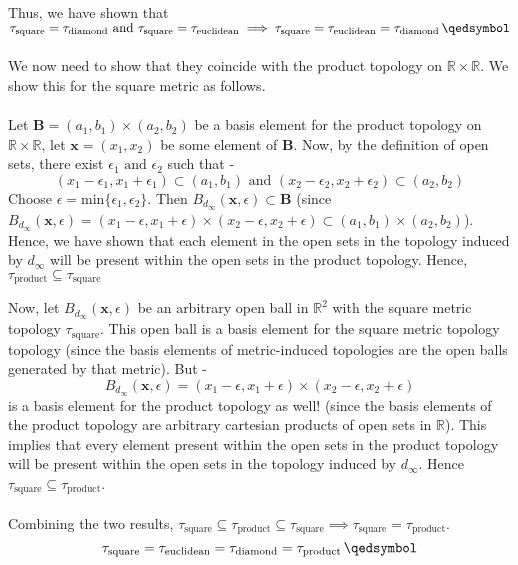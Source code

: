 \begin{frame}
    Thus, we have shown that $\tau_{\text{square}} = \tau_{\text{diamond}} \text{ and } \tau_{\text{square}} = \tau_{\text{euclidean}} \implies \tau_{\text{square}} = \tau_{\text{euclidean}} = \tau_{\text{diamond}} \, \qedsymbol$ \\\\
    We now need to show that they coincide with the product topology on $\mathbb{R} \times \mathbb{R}$. We show this for the square metric as follows. \\\\
    Let $\boldsymbol{B} = (a_1,b_1) \times (a_2,b_2)$ be a basis element for the product topology on $\mathbb{R} \times \mathbb{R}$, let $\boldsymbol{x} = (x_1, x_2)$ be some element of $\boldsymbol{B}$. Now, by the definition of open sets, there exist $\epsilon_1 \text{ and } \epsilon_2$ such that -
    \begin{equation*}
        (x_1 - \epsilon_1,x_1 + \epsilon_1) \subset (a_1,b_1) \text{ and }(x_2 - \epsilon_2,x_2 + \epsilon_2) \subset (a_2,b_2)
    \end{equation*}
    Choose $\epsilon = \text{min} \{\epsilon_1, \epsilon_2\}$. Then $B_{d_\infty}(\boldsymbol{x},\epsilon) \subset \boldsymbol{B}$ (since $B_{d_\infty}(\boldsymbol{x},\epsilon) = (x_1 - \epsilon,x_1 + \epsilon) \times (x_2 - \epsilon,x_2 + \epsilon)\subset (a_1,b_1) \times (a_2,b_2)$).\\
    Hence, we have shown that each element in the open sets in the topology induced by $d_\infty$ will be present within the open sets in the product topology. Hence, $\tau_{\text{product}} \subseteq \tau_{\text{square}}$
\end{frame}

\begin{frame}
    Now, let $B_{d_{\infty}}(\boldsymbol{x},\epsilon)$ be an arbitrary open ball in $\mathbb{R}^2$ with the square metric topology $\tau_{\text{square}}$. This open ball is a basis element for the square metric topology topology (since the basis elements of metric-induced topologies are the open balls generated by that metric). But -
    \begin{equation*}
        B_{d_{\infty}}(\boldsymbol{x},\epsilon) = (x_1 - \epsilon, x_1 + \epsilon) \times (x_2 - \epsilon, x_2 + \epsilon)
    \end{equation*}
    is a basis element for the product topology as well! (since the basis elements of the product topology are arbitrary cartesian products of open sets in $\mathbb{R}$). This implies that every element present within the open sets in the product topology will be present within the open sets in the topology induced by $d_\infty$. Hence $\tau_{\text{square}} \subseteq \tau_{\text{product}}$.\\\\
    Combining the two results, $\tau_{\text{square}} \subseteq \tau_{\text{product}} \subseteq \tau_{\text{square}} \implies \tau_{\text{square}} = \tau_{\text{product}}$.
    \begin{equation*}
        \tau_{\text{square}} = \tau_{\text{euclidean}} = \tau_{\text{diamond}} = \tau_{\text{product}} \, \qedsymbol
    \end{equation*}
\end{frame}